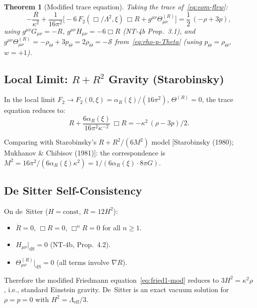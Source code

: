 \documentclass[12pt,a4paper]{article}
\newtheorem{theorem}[proposition]{Theorem}
\theoremstyle{definition}
\theoremstyle{remark}
\newcommand{\fromlit}[1]{\textcolor{blue!70!black}{\textsf{[#1]}}}
\begin{document}
\begin{theorem}[Modified trace equation]\label{thm:trace-mod}
Taking the trace of~\eqref{eq:eom-flrw}:
\begin{equation}\label{eq:trace-mod}
  -\frac{R}{\kappa^2}
  + \frac{1}{16\pi^2}\bigl[
  -6\,F_2(\Box/\Lambda^2,\xi)\,\Box R
  + g^{\mu\nu}\Theta^{(R)}_{\mu\nu}\bigr]
  = \frac{1}{2}\,(-\rho + 3p),
\end{equation}
using $g^{\mu\nu}G_{\mu\nu} = -R$,
$g^{\mu\nu}H_{\mu\nu} = -6\Box R$ (NT-4b Prop.~3.1),
and $g^{\mu\nu}\Theta^{(R)}_{\mu\nu} = -\rho_\Theta + 3p_\Theta
= 2\rho_\Theta = -\mathcal{S}$ from~\eqref{eq:rho-p-Theta}
(using $p_\Theta = \rho_\Theta$, $w = +1$).
\end{theorem}

\subsection{Local Limit: $R + R^2$ Gravity (Starobinsky)}

In the local limit $F_2 \to F_2(0,\xi) = \alpha_R(\xi)/(16\pi^2)$,
$\Theta^{(R)} = 0$, the trace equation reduces to:
\begin{equation}\label{eq:trace-local}
  R + \frac{6\alpha_R(\xi)}{16\pi^2\kappa^{-2}}\,\Box R
  = -\kappa^2\,(\rho - 3p)/2.
\end{equation}

Comparing with Starobinsky's $R + R^2/(6M^2)$ model
\fromlit{Starobinsky (1980); Mukhanov \& Chibisov (1981)}: the
correspondence is $M^2 = 16\pi^2/(6\alpha_R(\xi)\kappa^2)
= 1/(6\alpha_R(\xi)\cdot 8\pi G)$.

\subsection{De Sitter Self-Consistency}

On de~Sitter ($H = \mathrm{const}$, $R = 12H^2$):
\begin{itemize}[nosep]
  \item $\dot{R} = 0$, $\Box R = 0$, $\Box^n R = 0$ for all
    $n \geq 1$.
  \item $H_{\mu\nu}|_{\mathrm{dS}} = 0$ (NT-4b, Prop.~4.2).
  \item $\Theta^{(R)}_{\mu\nu}|_{\mathrm{dS}} = 0$ (all terms
    involve $\nabla R$).
\end{itemize}
Therefore the modified Friedmann equation~\eqref{eq:fried1-mod}
reduces to $3H^2 = \kappa^2\rho$, i.e., standard Einstein gravity.
De~Sitter is an exact vacuum solution for $\rho = p = 0$ with
$H^2 = \Lambda_{\mathrm{eff}}/3$.
\end{document}

